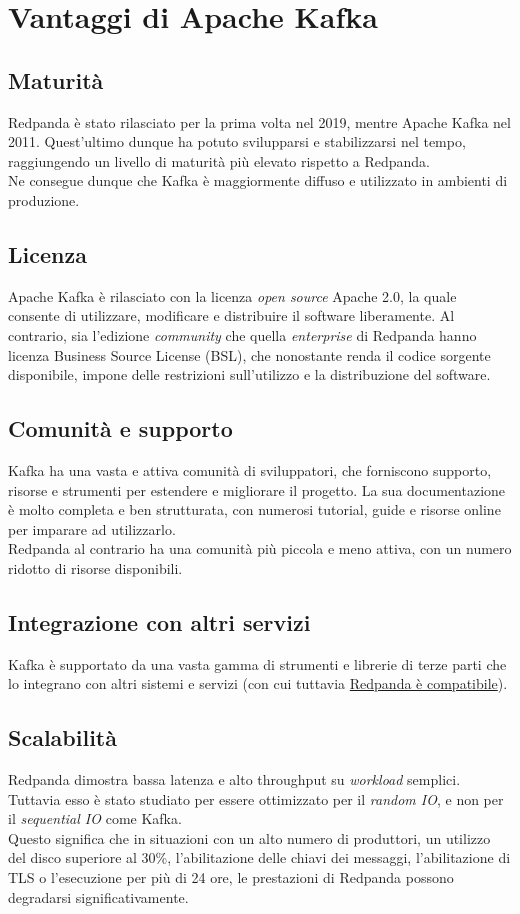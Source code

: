 \section{Vantaggi di Apache Kafka}
\subsection{Maturità}
Redpanda è stato rilasciato per la prima volta nel 2019, mentre Apache Kafka nel 2011.
Quest'ultimo dunque ha potuto svilupparsi e stabilizzarsi nel tempo, raggiungendo
un livello di maturità più elevato rispetto a Redpanda.\\
Ne consegue dunque che Kafka è maggiormente diffuso e utilizzato in ambienti di
produzione.

\subsection{Licenza}
Apache Kafka è rilasciato con la licenza \textit{open source} Apache 2.0, la quale consente di utilizzare, modificare e distribuire il software liberamente.
Al contrario, sia l'edizione \textit{community} che quella \textit{enterprise} di Redpanda hanno licenza Business Source License (BSL), che
nonostante renda il codice sorgente disponibile, impone delle restrizioni sull'utilizzo e la distribuzione del software.


\subsection{Comunità e supporto}
Kafka ha una vasta e attiva comunità di sviluppatori, che forniscono supporto, risorse e strumenti per estendere e migliorare il progetto.
La sua documentazione è molto completa e ben strutturata, con numerosi tutorial, guide e risorse online per imparare ad utilizzarlo.\\
Redpanda al contrario ha una comunità più piccola e meno attiva, con un numero ridotto di risorse disponibili.

\subsection{Integrazione con altri servizi}
Kafka è supportato da una vasta gamma di strumenti e librerie di terze parti che lo integrano con altri sistemi e servizi
(con cui tuttavia \href{https://docs.redpanda.com/current/develop/kafka-clients/}{Redpanda è compatibile}).

\subsection{Scalabilità}
Redpanda dimostra bassa latenza e alto throughput su \textit{workload} semplici. Tuttavia esso è stato studiato per essere ottimizzato per il \textit{random IO}, e non per il \textit{sequential IO} come Kafka.\\
Questo significa che in situazioni con un alto numero di produttori, un utilizzo del disco superiore al 30\%, l'abilitazione delle chiavi dei messaggi, l'abilitazione di TLS o l'esecuzione per più di 24 ore,
le prestazioni di Redpanda possono degradarsi significativamente.\\


